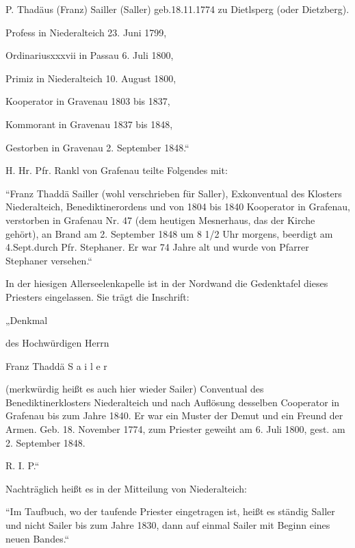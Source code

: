 \documentclass{book}
\begin{document}
P. Thadäus (Franz) Sailler (Saller) geb.18.11.1774 zu Dietlsperg (oder
Dietzberg).

Profess in Niederalteich 23. Juni 1799,

Ordinariusxxxvii in  Passau 6. Juli 1800,

Primiz in Niederalteich 10. August 1800,

Kooperator in Gravenau 1803 bis 1837,

Kommorant in Gravenau 1837 bis 1848,

Gestorben in Gravenau 2. September 1848.“



H. Hr. Pfr. Rankl von Grafenau teilte Folgendes mit:



“Franz Thaddä Sailler (wohl verschrieben für Saller), Exkonventual des Klosters
Niederalteich, Benediktinerordens und von 1804 bis 1840 Kooperator in Grafenau,
verstorben in Grafenau Nr. 47 (dem heutigen Mesnerhaus, das der Kirche gehört),
an Brand am 2. September 1848 um 8 1/2 Uhr morgens, beerdigt am 4.Sept.durch Pfr.
Stephaner. Er war 74 Jahre alt und wurde von Pfarrer Stephaner versehen.“



In der hiesigen Allerseelenkapelle ist in der Nordwand die Gedenktafel dieses
Priesters eingelassen. Sie trägt die Inschrift:



„Denkmal

des Hochwürdigen Herrn

Franz Thaddä S a i l e r

(merkwürdig heißt es auch hier wieder Sailer) Conventual des
Benediktinerklosters Niederalteich und nach Auflösung desselben Cooperator in
Grafenau bis zum Jahre 1840. Er war ein Muster der Demut und ein Freund der
Armen. Geb. 18. November 1774, zum Priester geweiht am 6. Juli 1800, gest. am 2.
September 1848.

R. I. P.“



Nachträglich heißt es in der Mitteilung von Niederalteich:



“Im Taufbuch, wo der taufende Priester eingetragen ist, heißt es ständig Saller
und nicht Sailer bis zum Jahre 1830, dann auf einmal Sailer mit Beginn eines
neuen Bandes.“
\end{document}
